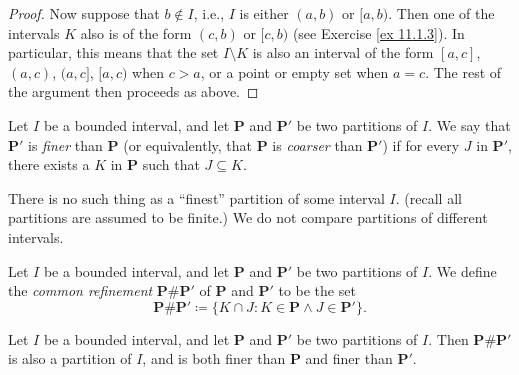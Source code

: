 \begin{proof}
    Now suppose that \(b \notin I\), i.e., \(I\) is either \((a, b)\) or \([a, b)\).
    Then one of the intervals \(K\) also is of the form \((c, b)\) or \([c, b)\) (see Exercise \ref{ex 11.1.3}).
            In particular, this means that the set \(I \setminus K\) is also an interval of the form \([a, c]\), \((a, c)\), \((a, c]\), \([a, c)\) when \(c > a\), or a point or empty set when \(a = c\).
    The rest of the argument then proceeds as above.
\end{proof}

\begin{definition}\label{11.1.14}
    Let \(I\) be a bounded interval, and let \(\mathbf{P}\) and \(\mathbf{P}'\) be two partitions of \(I\).
    We say that \(\mathbf{P}'\) is \emph{finer} than \(\mathbf{P}\) (or equivalently, that \(\mathbf{P}\) is \emph{coarser} than \(\mathbf{P}'\)) if for every \(J\) in \(\mathbf{P}'\), there exists a \(K\) in \(\mathbf{P}\) such that \(J \subseteq K\).
\end{definition}

\begin{note}
    There is no such thing as a ``finest'' partition of some interval \(I\).
    (recall all partitions are assumed to be finite.)
    We do not compare partitions of different intervals.
\end{note}

\setcounter{theorem}{15}
\begin{definition}\label{11.1.16}
    Let \(I\) be a bounded interval, and let \(\mathbf{P}\) and \(\mathbf{P}'\) be two partitions of \(I\).
    We define the \emph{common refinement} \(\mathbf{P} \# \mathbf{P}'\) of \(\mathbf{P}\) and \(\mathbf{P}'\) to be the set
    \[
        \mathbf{P} \# \mathbf{P}' \coloneqq \{K \cap J : K \in \mathbf{P} \land J \in \mathbf{P}'\}.
    \]
\end{definition}

\setcounter{theorem}{17}
\begin{lemma}\label{11.1.18}
    Let \(I\) be a bounded interval, and let \(\mathbf{P}\) and \(\mathbf{P}'\) be two partitions of \(I\).
    Then \(\mathbf{P} \# \mathbf{P}'\) is also a partition of \(I\), and is both finer than \(\mathbf{P}\) and finer than \(\mathbf{P}'\).
\end{lemma}

